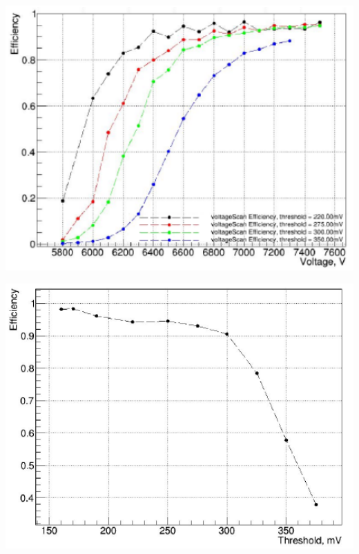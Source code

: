 \noindent
\begin{minipage}[t]{.48\textwidth}
	\noindent
	\centering
	\includegraphics[width=1\textwidth]{GLA/HVH2.png}
	\captionsetup{type=figure}\caption{Efficacité de la chambre en verre de basse résistivité en fonction de la haute tension appliquée pour différents seuils \SI{220}{\milli\volt} en noir, \SI{275}{\milli\volt} en rouge, \SI{300}{\milli\volt} en vert, \SI{350}{\milli\volt} en bleu. }
	\label{HVH2}
\end{minipage}%
\hfill
\begin{minipage}[t]{.48\textwidth}
	\noindent
	\centering
	\includegraphics[width=1\textwidth]{GLA/THH2.png}
	\captionsetup{type=figure}\caption{Efficacité de la chambre de basse résistivité en fonction du seuil appliqué. La tension appliquée est de \SI{7000}{\volt}.}
	\label{THH2}
\end{minipage}

